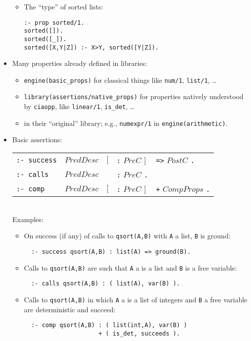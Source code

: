 \documentclass{article}
\renewcommand{\_}{\char'137}
\begin{document}
\begin{itemize}
\begin{itemize}
   \item The ``type'' of sorted lists:
\begin{verbatim}
:- prop sorted/1.
sorted([]).
sorted([_]).
sorted([X,Y|Z]) :- X>Y, sorted([Y|Z]).
\end{verbatim}
\end{itemize}

\item Many properties already defined in libraries:
\begin{itemize}
\item \verb+engine(basic_props)+ for classical things like
  \verb+num/1+, \verb+list/1+, \ldots
\item \verb+library(assertions/native_props)+ for properties
  natively understood by {\tt ciaopp}, like \verb+linear/1+,
  \verb+is_det+, \ldots
\item in their ``original'' library; e.g., \verb+numexpr/1+ in
  \verb+engine(arithmetic)+. 
\end{itemize}

\item Basic assertions:

\begin{tabular}{|lllll|}
\hline
{\tt :- success} & $PredDesc$ & $[$ & {\tt :} $PreC$ $]$  & {\tt =>} $PostC$ {\tt .}\\
{\tt :- calls}   & $PredDesc$ &     & {\tt :} $PreC$ {\tt .} & \\

{\tt :- comp}    & $PredDesc$ & $[$ & {\tt :} $PreC$ $]$  & {\tt +} $CompProps$ {\tt .}\\ [2mm]
\hline
\end{tabular} \\


Examples:
\begin{itemize}
  \item On success (if any) of calls to \verb+qsort(A,B)+ with \verb+A+ a
  list, \verb+B+ is ground:
\begin{verbatim}
  :- success qsort(A,B) : list(A) => ground(B).
\end{verbatim}
  \item Calls to \verb+qsort(A,B)+ are such that \verb+A+ a is a list
  and \verb+B+ is a free variable:
\begin{verbatim}
  :- calls qsort(A,B) : ( list(A), var(B) ).
\end{verbatim}
  \item Calls to \verb+qsort(A,B)+ in which \verb+A+ a is a list of
  integers and \verb+B+ a free variable are deterministic and succeed:
\begin{verbatim}
  :- comp qsort(A,B) : ( list(int,A), var(B) )
                     + ( is_det, succeeds ).
\end{verbatim}
\end{itemize}


\end{itemize}
\end{document}
